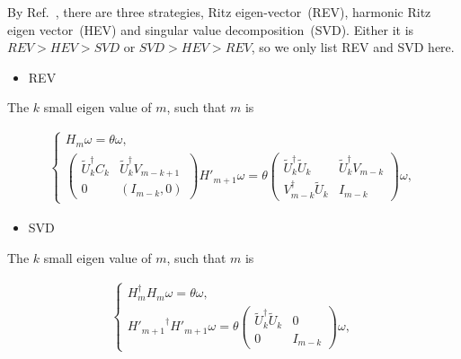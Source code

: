 By Ref.~\cite{deflation}, there are three strategies, Ritz eigen-vector~(REV), harmonic Ritz eigen vector~(HEV) and singular value decomposition~(SVD). Either it is $REV>HEV>SVD$ or $SVD>HEV>REV$, so we only list REV and SVD here.

\begin{itemize}
  \item REV
\end{itemize}

The $k$ small eigen value of $m$, such that $m$ is

\begin{equation}
\begin{split}
\left\{\begin{array}{l}
H_m\omega = \theta \omega,\\
\left(\begin{array}{cc} \tilde{U}_k^{\dagger}C_k & \tilde{U}_k^{\dagger}V_{m-k+1} \\ 0 & (I_{m-k},0)\end{array}\right) H'_{m+1}\omega = \theta \left(\begin{array}{cc} \tilde{U}_k^{\dagger}\tilde{U}_{k}  & \tilde{U}_k^{\dagger}V_{m-k} \\ V_{m-k}^{\dagger}\tilde{U}_k & I_{m-k}\end{array}\right)\omega,
\end{array}\right.
\end{split}
\end{equation}

\begin{itemize}
  \item SVD
\end{itemize}

The $k$ small eigen value of $m$, such that $m$ is

\begin{equation}
\begin{split}
\left\{\begin{array}{l}
H_m^{\dagger}H_m\omega = \theta \omega,\\
{H'_{m+1}}^{\dagger}H'_{m+1}\omega = \theta \left(\begin{array}{cc} \tilde{U}_k^{\dagger}\tilde{U}_{k}  & 0 \\ 0 & I_{m-k}\end{array}\right)\omega,
\end{array}\right.
\end{split}
\end{equation}

